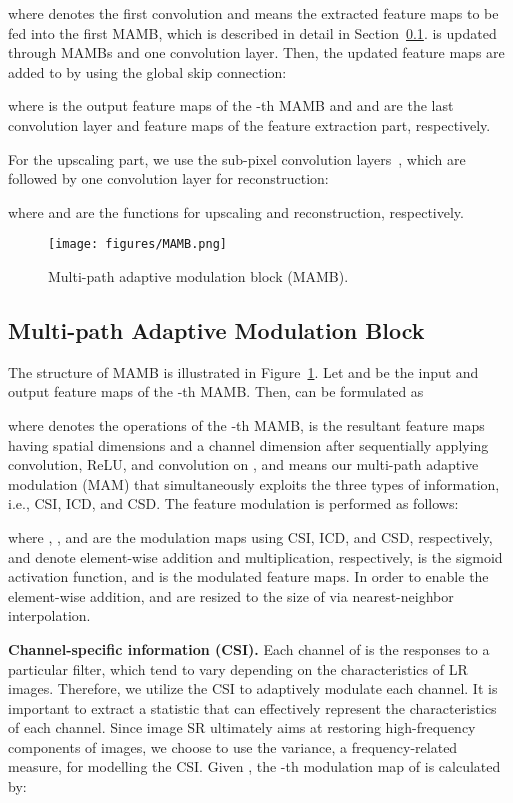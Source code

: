 \documentclass[final,5p,times,twocolumn]{elsarticle}
\begin{document}
where  denotes the first convolution and  means the extracted feature maps to be fed into the first MAMB, which is described in detail in Section~\ref{section:MAMB}.
 is updated through  MAMBs and one convolution layer.
Then, the updated feature maps are added to  by using the global skip connection:

where  is the output feature maps of the -th MAMB and  and  are the last convolution layer and feature maps of the feature extraction part, respectively.


For the upscaling part, we use the sub-pixel convolution layers~\cite{shi2016real}, which are followed by one convolution layer for reconstruction:

where  and  are the functions for upscaling and reconstruction, respectively.   

\begin{figure}[t]
	\centering
	\texttt{[image: figures/MAMB.png]}
	\caption{Multi-path adaptive modulation block (MAMB).
	} 
	\label{fig:MAMB}
\end{figure}

\subsection{Multi-path Adaptive Modulation Block}
\label{section:MAMB}
The structure of MAMB is illustrated in Figure~\ref{fig:MAMB}.
Let  and  be the input and output feature maps of the -th MAMB.
Then,  can be formulated as 

where  denotes the operations of the -th MAMB,  is the resultant feature maps having spatial dimensions  and a channel dimension  after sequentially applying convolution, ReLU, and convolution on , and  means our multi-path adaptive modulation (MAM) that simultaneously exploits the three types of information, i.e., CSI, ICD, and CSD.
The feature modulation is performed as follows:

where , , and  are the modulation maps using CSI, ICD, and CSD, respectively,  and  denote element-wise addition and multiplication, respectively,  is the sigmoid activation function,
and  is the modulated feature maps.
In order to enable the element-wise addition,  and  are resized to the size of  via nearest-neighbor interpolation.

\textbf{Channel-specific information (CSI).}
Each channel of  is the responses to a particular filter, which tend to vary depending on the characteristics of LR images.
Therefore, we utilize the CSI to adaptively modulate each channel.
It is important to extract a statistic that can effectively represent the characteristics of each channel.
Since image SR ultimately aims at restoring high-frequency components of images, we choose to use the variance, a frequency-related measure, for modelling the CSI.
Given , the -th modulation map  of  is calculated by:
\end{document}
